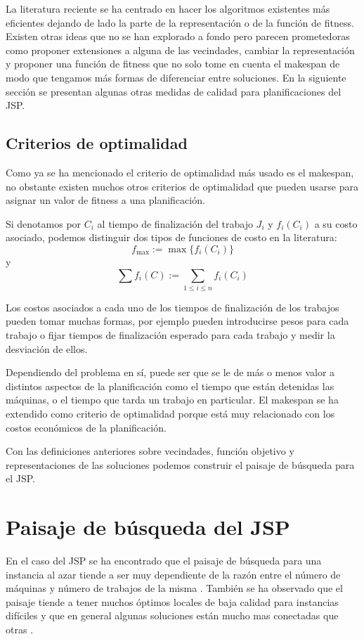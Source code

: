 La literatura reciente se ha centrado en hacer los algoritmos existentes más eficientes dejando de lado la parte de la representación o de la función de fitness. Existen otras ideas que no se han explorado a fondo pero parecen prometedoras como proponer extensiones a alguna de las vecindades, cambiar la representación y proponer una función de fitness que no solo tome en cuenta el makespan de modo que tengamos más formas de diferenciar entre soluciones. En la siguiente sección se presentan algunas otras medidas de calidad para planificaciones del JSP.
\subsection*{Criterios de optimalidad}
Como ya se ha mencionado el criterio de optimalidad más usado es el makespan, no obstante existen muchos otros criterios de optimalidad que pueden usarse para asignar un valor de fitness a una planificación. 

Si denotamos por $C_i$ al tiempo de finalización del trabajo $J_i$ y $f_i(C_i)$ a su costo asociado, podemos distinguir dos tipos de funciones de costo en la literatura\cite{Brucker2001}:
\[f_{\max}:=\max\{f_i(C_i)\}\]
y 
\[\sum f_i(C):=\sum_{1\leq i\leq n}f_i(C_i)\]

Los costos asociados a cada uno de los tiempos de finalización de los trabajos pueden tomar muchas formas, por ejemplo pueden introducirse pesos para cada trabajo o fijar tiempos de finalización esperado para cada trabajo y medir la desviación de ellos.

Dependiendo del problema en sí, puede ser que se le de más o menos valor a distintos aspectos de la planificación como el tiempo que están detenidas las máquinas, o el tiempo que tarda un trabajo en particular. El makespan se ha extendido como criterio de optimalidad porque está muy relacionado con los costos económicos de la planificación\cite{Rand1977}.


Con las definiciones anteriores sobre vecindades, función objetivo y representaciones de las soluciones podemos construir el paisaje de búsqueda para el JSP. 

\section{Paisaje de búsqueda del JSP}
En el caso del JSP se ha encontrado que el paisaje de búsqueda para una instancia al azar tiende a ser muy dependiente de la razón entre el número de máquinas y número de trabajos de la misma \cite{Streeter2006}. También se ha observado que el paisaje tiende a tener muchos óptimos locales de baja calidad para instancias difíciles \cite{mattfeld1999search} y que en general algunas soluciones están mucho mas conectadas que otras \cite{bierwirth2004landscape}. 


